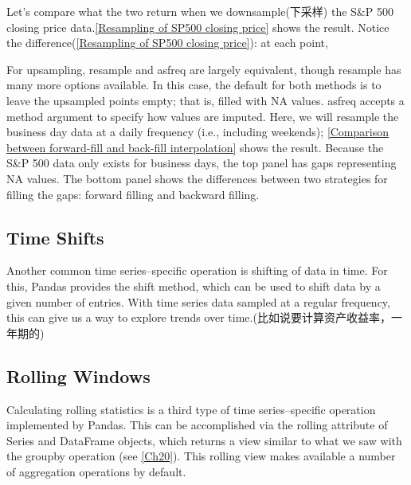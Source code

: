 Let's compare what the two return when we downsample(下采样) the S\&P 500 closing price
data.\autoref{Resampling of SP500 closing price} shows
the result.
Notice the difference(\autoref{Resampling of SP500 closing price}): at each point, 

For upsampling, resample and asfreq are largely equivalent, though resample has
many more options available. In this case, the default for both methods is to leave the
upsampled points empty; that is, filled with NA values. asfreq accepts a method argument to specify how values are
imputed. Here, we will resample the business day data at a daily frequency (i.e.,
including weekends); \autoref{Comparison between forward-fill and back-fill interpolation} shows the result. Because the S\&P 500 data only exists for business days, the top panel has gaps representing NA values. The bottom panel shows the differences between two strategies for
filling the gaps: forward filling and backward filling.

\subsection*{Time Shifts}
Another common time series–specific operation is shifting of data in time. For this,
Pandas provides the shift method, which can be used to shift data by a given number of entries. With time series data sampled at a regular frequency, this can give us a
way to explore trends over time.(比如说要计算资产收益率，一年期的)

\subsection*{Rolling Windows}
Calculating rolling statistics is a third type of time series–specific operation implemented by Pandas. This can be accomplished via the rolling attribute of Series and
DataFrame objects, which returns a view similar to what we saw with the groupby
operation (see \autoref{Ch20}). This rolling view makes available a number of aggregation operations by default.